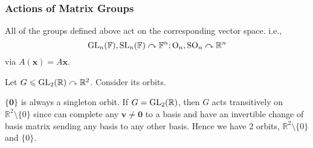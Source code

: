 \documentclass[a4paper]{article}
\begin{document}
\subsubsection{Actions of Matrix Groups}
All of the groups defined above act on the corresponding vector space. i.e.,
\[
  \mathrm{GL}_n(\mathbb{F}),\mathrm{SL}_n(\mathbb{F}) \curvearrowright \mathbb{F}^n;
  \mathrm{O}_n,\mathrm{SO}_n \curvearrowright \mathbb{R}^n
\]
via $ A(\mathbf{x})=A\mathbf{x} $.

\begin{example}
  Let $ G\leqslant \mathrm{GL}_2(\mathbb{R})\curvearrowright \mathbb{R}^2 $.
  Consider its orbits.

  $ \{\mathbf{0}\} $ is always a singleton orbit. If $
  G=\mathrm{GL}_2(\mathbb{R}) $, then $G$ acts transitively on $
  \mathbb{R}^{2}\setminus\{0\} $ since can complete any $
  \mathbf{v}\neq \mathbf{0} $ to a basis and have an invertible
  change of basis matrix sending any basis to any other basis. Hence
  we have 2 orbits, $ \mathbb{R}^{2}\setminus\{0\} $ and $ \{0\} $.
\end{example}
\end{document}
